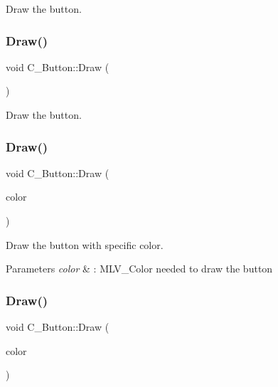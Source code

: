 Draw the button. 

\mbox{\label{classC__Button_a71f9a7d92a30818af1539104e6b963fb}} 
\subsubsection{\texorpdfstring{Draw()}{Draw()}\hspace{0.1cm}{\footnotesize\ttfamily [2/4]}}
{\footnotesize\ttfamily void C\+\_\+\+Button\+::\+Draw (\begin{DoxyParamCaption}{ }\end{DoxyParamCaption})}



Draw the button. 

\mbox{\label{classC__Button_a6c507d4567ca21676e9980f8cf3d26b5}} 
\subsubsection{\texorpdfstring{Draw()}{Draw()}\hspace{0.1cm}{\footnotesize\ttfamily [3/4]}}
{\footnotesize\ttfamily void C\+\_\+\+Button\+::\+Draw (\begin{DoxyParamCaption}\item[{M\+L\+V\+\_\+\+Color}]{color }\end{DoxyParamCaption})}



Draw the button with specific color. 


\begin{DoxyParams}{Parameters}
{\em color} & \+: M\+L\+V\+\_\+\+Color needed to draw the button \\
\hline
\end{DoxyParams}
\mbox{\label{classC__Button_a6c507d4567ca21676e9980f8cf3d26b5}} 
\subsubsection{\texorpdfstring{Draw()}{Draw()}\hspace{0.1cm}{\footnotesize\ttfamily [4/4]}}
{\footnotesize\ttfamily void C\+\_\+\+Button\+::\+Draw (\begin{DoxyParamCaption}\item[{M\+L\+V\+\_\+\+Color}]{color }\end{DoxyParamCaption})}



